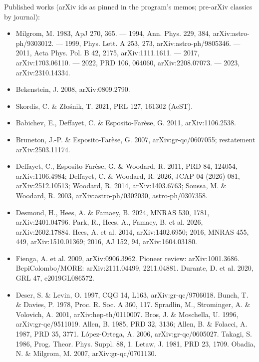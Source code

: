 \documentclass[11pt,a4paper]{article}
\begin{document}
Published works (arXiv ids as pinned in the program's memos; pre-arXiv classics by journal):

\begin{itemize}
\item Milgrom, M. 1983, ApJ 270, 365. --- 1994, Ann. Phys. 229, 384, arXiv:astro-ph/9303012. --- 1999, Phys. Lett. A 253, 273, arXiv:astro-ph/9805346. --- 2011, Acta Phys. Pol. B 42, 2175, arXiv:1111.1611. --- 2017, arXiv:1703.06110. --- 2022, PRD 106, 064060, arXiv:2208.07073. --- 2023, arXiv:2310.14334.

\item Bekenstein, J. 2008, arXiv:0809.2790.

\item Skordis, C. \& Z\l{}o\'snik, T. 2021, PRL 127, 161302 (AeST).

\item Babichev, E., Deffayet, C. \& Esposito-Far\`ese, G. 2011, arXiv:1106.2538.

\item Bruneton, J.-P. \& Esposito-Far\`ese, G. 2007, arXiv:gr-qc/0607055; restatement arXiv:2503.11174.

\item Deffayet, C., Esposito-Far\`ese, G. \& Woodard, R. 2011, PRD 84, 124054, arXiv:1106.4984; Deffayet, C. \& Woodard, R. 2026, JCAP 04 (2026) 081, arXiv:2512.10513; Woodard, R. 2014, arXiv:1403.6763; Soussa, M. \& Woodard, R. 2003, arXiv:astro-ph/0302030, astro-ph/0307358.

\item Desmond, H., Hees, A. \& Famaey, B. 2024, MNRAS 530, 1781, arXiv:2401.04796. Park, R., Hees, A., Famaey, B. et al. 2026, arXiv:2602.17884. Hees, A. et al. 2014, arXiv:1402.6950; 2016, MNRAS 455, 449, arXiv:1510.01369; 2016, AJ 152, 94, arXiv:1604.03180.

\item Fienga, A. et al. 2009, arXiv:0906.3962. Pioneer review: arXiv:1001.3686. BepiColombo/MORE: arXiv:2111.04499, 2211.04881. Durante, D. et al. 2020, GRL 47, e2019GL086572.

\item Deser, S. \& Levin, O. 1997, CQG 14, L163, arXiv:gr-qc/9706018. Bunch, T. \& Davies, P. 1978, Proc. R. Soc. A 360, 117. Spradlin, M., Strominger, A. \& Volovich, A. 2001, arXiv:hep-th/0110007. Bros, J. \& Moschella, U. 1996, arXiv:gr-qc/9511019. Allen, B. 1985, PRD 32, 3136; Allen, B. \& Folacci, A. 1987, PRD 35, 3771. L\'opez-Ortega, A. 2006, arXiv:gr-qc/0605027. Takagi, S. 1986, Prog. Theor. Phys. Suppl. 88, 1. Letaw, J. 1981, PRD 23, 1709. Obadia, N. \& Milgrom, M. 2007, arXiv:gr-qc/0701130.


\end{itemize}
\end{document}

